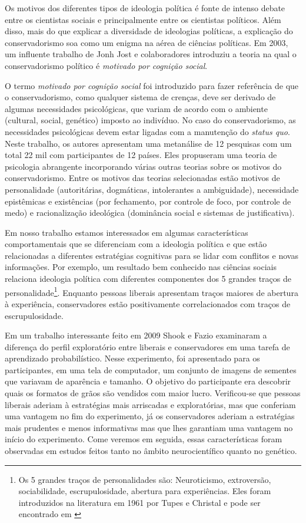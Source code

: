 Os motivos dos diferentes tipos de ideologia política é fonte de intenso debate
entre os cientistas sociais e principalmente entre os cientistas políticos.
Além disso, mais do que explicar a diversidade de ideologias políticas, a
explicação do conservadorismo soa como um enigma na aérea de ciências
políticas. Em 2003, um influente trabalho de Jonh Jost e colaboradores
\citep{Jost2003} introduziu a teoria na qual o conservadorismo político é
\textit{motivado por cognição social}. 

O termo \textit{motivado por cognição social} foi introduzido para fazer
referência de que o conservadorismo, como qualquer sistema de crenças,
deve ser derivado de algumas necessidades psicológicas, que variam de acordo
com o ambiente (cultural, social, genético) imposto ao indivíduo.  No caso
do conservadorismo, as necessidades psicológicas devem estar ligadas com a
manutenção do \textit{status quo}.  Neste trabalho, os autores apresentam
uma metanálise de 12 pesquisas com um total 22 mil com participantes de
12 países. Eles propuseram uma teoria de psicologia abrangente incorporando
várias outras teorias sobre os motivos do conservadorismo. Entre os motivos
das teorias selecionadas estão motivos de personalidade (autoritárias,
dogmáticas, intolerantes a ambiguidade), necessidade epistêmicas e
existências (por fechamento, por controle de foco, por controle de medo) e
racionalização ideológica (dominância social e sistemas de justificativa).

Em nosso trabalho estamos interessados em algumas características
comportamentais que se diferenciam com a ideologia política e que estão
relacionadas a diferentes estratégias cognitivas para se lidar com conflitos
e novas informações. Por exemplo, um resultado bem conhecido nas ciências
sociais relaciona ideologia política com diferentes componentes dos 5 grandes
traços de personalidade\footnote{Os 5 grandes traços de personalidades
são: Neuroticismo, extroversão, sociabilidade, escrupulosidade, abertura
para experiências. Eles foram introduzidos na literatura em 1961 por
Tupes e Christal e pode ser encontrado em \citep{Tupes1961}}.  Enquanto
pessoas liberais apresentam traços maiores de abertura à experiência,
conservadores estão positivamente correlacionados com traços de
escrupulosidade\cite{Gerber2010}.

Em um trabalho interessante feito em 2009 \cite{Shook2009} Shook e
Fazio examinaram a diferença do perfil exploratório entre liberais e
conservadores em uma tarefa de aprendizado probabilístico. Nesse experimento,
foi apresentado para os participantes, em uma tela de computador, um conjunto
de imagens de sementes que variavam de aparência e tamanho. O objetivo do
participante era descobrir quais os formatos de grãos são vendidos com maior
lucro. Verificou-se que pessoas liberais aderiam à estratégias
mais arriscadas e exploratórias, mas que conferiam uma vantagem no fim do
experimento, já os conservadores aderiam a estratégias mais prudentes e menos
informativas mas que lhes garantiam uma vantagem no início do experimento.
Come veremos em seguida, essas características foram observadas em  estudos
feitos tanto no âmbito neurocientífico quanto no genético.

